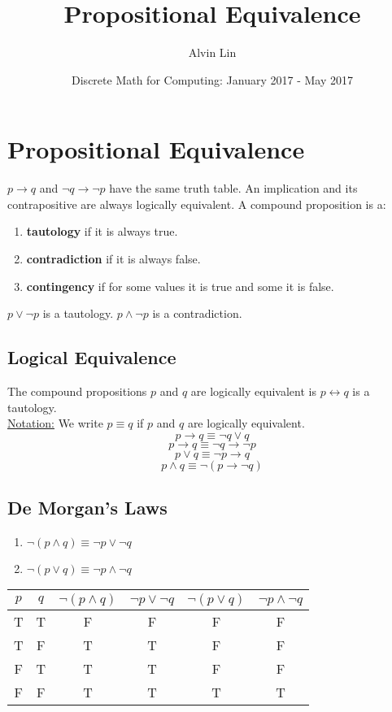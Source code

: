 \documentclass[letterpaper, 12pt]{math}
\title{Propositional Equivalence}
\author{Alvin Lin}
\date{Discrete Math for Computing: January 2017 - May 2017}
\begin{document}
\maketitle

\section*{Propositional Equivalence}
\( p \to q \)  and \( \neg{q} \to \neg{p} \) have the same truth table. An
implication and its contrapositive are always logically equivalent.
A compound proposition is a:
\begin{enumerate}
  \item \textbf{tautology} if it is always true.
  \item \textbf{contradiction} if it is always false.
  \item \textbf{contingency} if for some values it is true and some it is false.
\end{enumerate}
\( p \vee \neg{p} \) is a tautology. \( p \wedge \neg{p} \) is a contradiction.

\subsection*{Logical Equivalence}
The compound propositions \( p \) and \( q \) are logically equivalent is
\( p \leftrightarrow q \) is a tautology. \\
\underline{Notation:} We write \( p \equiv q \) if \( p \) and \( q \) are
logically equivalent.
\[ p \to q \equiv \neg{q} \vee q \]
\[ p \to q \equiv \neg{q} \to \neg{p} \]
\[ p \vee q \equiv \neg{p} \to q \]
\[ p \wedge q \equiv \neg{(p \to \neg{q})} \]

\subsection*{De Morgan's Laws}
\begin{enumerate}
  \item \( \neg{(p \wedge q)} \equiv \neg{p} \vee \neg{q} \)
  \item \( \neg{(p \vee q)} \equiv \neg{p} \wedge \neg{q} \)
\end{enumerate}
\begin{center}
  \begin{tabular}{|c|c|c|c|c|c|}
    \hline
    \( p \) & \( q \) & \( \neg{(p \wedge q)} \) & \( \neg{p} \vee \neg{q} \) &
    \( \neg{(p \vee q)} \) & \( \neg{p} \wedge \neg{q} \) \\ \hline
    T & T & F & F & F & F \\ \hline
    T & F & T & T & F & F \\ \hline
    F & T & T & T & F & F \\ \hline
    F & F & T & T & T & T \\ \hline
  \end{tabular}
\end{center}
\end{document}
